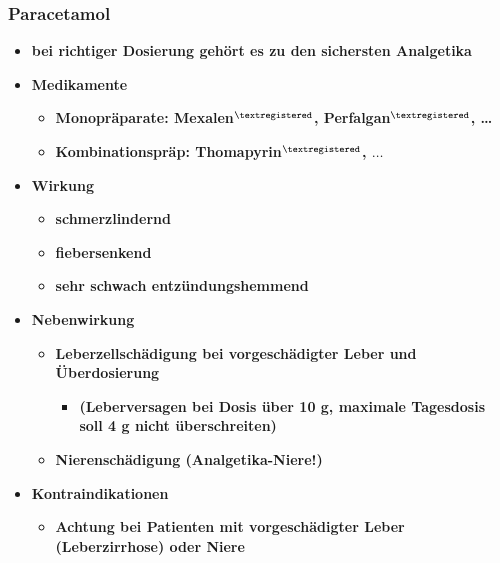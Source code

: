 \subsubsection{Paracetamol}
	\begin{itemize}
		\item \textbf{bei richtiger Dosierung gehört es zu den sichersten Analgetika}
		\item \textbf{Medikamente}
			\begin{itemize}
				\item \textbf{Monopräparate: Mexalen$^{\textregistered}$, Perfalgan$^{\textregistered}$, …}
				\item \textbf{Kombinationspräp: Thomapyrin$^{\textregistered}$, $\dots$}
			\end{itemize}
		\item \textbf{Wirkung}
			\begin{itemize}
				\item \textbf{schmerzlindernd}
				\item \textbf{fiebersenkend}
				\item \textbf{sehr schwach entzündungshemmend}
			\end{itemize}
		\item \textbf{Nebenwirkung}
			\begin{itemize}
				\item \textbf{Leberzellschädigung bei vorgeschädigter Leber und Überdosierung}
					\begin{itemize}
						\item \textbf{(Leberversagen bei Dosis über 10 g, maximale Tagesdosis soll 4 g nicht überschreiten)}
					\end{itemize}
				\item \textbf{Nierenschädigung (Analgetika-Niere!)}
			\end{itemize}
		\item \textbf{Kontraindikationen}
			\begin{itemize}
				\item \textbf{Achtung bei Patienten mit vorgeschädigter Leber (Leberzirrhose) oder Niere}
			\end{itemize}
	\end{itemize}
				
